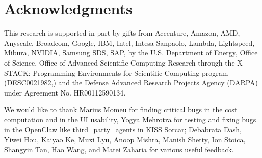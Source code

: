 \documentclass{article}
\begin{document}
\section*{Acknowledgments}

This research is supported in part by gifts from Accenture, Amazon, AMD, Anyscale, Broadcom, Google, IBM, Intel, Intesa Sanpaolo, Lambda, Lightspeed, Mibura, NVIDIA, Samsung SDS, SAP, by the U.S. Department of Energy, Office of Science, Office of Advanced Scientific Computing Research through the X-STACK: Programming Environments for Scientific Computing program (DESC0021982,) and the Defense Advanced Research Projects Agency (DARPA) under Agreement No. HR00112590134.

We would like to thank Marius Momeu for finding critical bugs in the cost computation and in the UI usability, Yogya Mehrotra for testing and fixing bugs in the OpenClaw like third\_party\_agents in KISS Sorcar; Debabrata Dash, Yiwei Hou, Kaiyao Ke, Muxi Lyu, Anoop Mishra, Manish Shetty, Ion Stoica, Shangyin Tan, Hao Wang, and Matei Zaharia for various useful feedback.



{ \small



}
\end{document}
